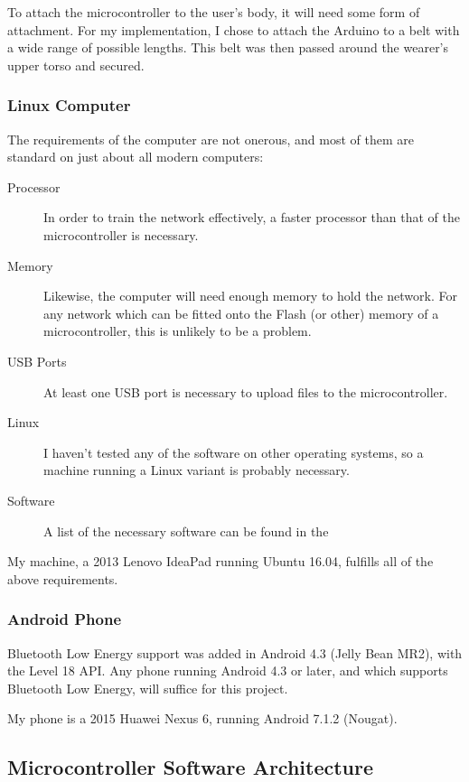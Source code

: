 \documentclass[a4paper]{article}
\begin{document}
To attach the microcontroller to the user's body, it will need some form of attachment. For my implementation, I chose to attach the Arduino to a belt with a wide range of possible lengths. This belt was then passed around the wearer's upper torso and secured. 


\subsubsection{Linux Computer}

The requirements of the computer are not onerous, and most of them are standard on just about all modern computers:

\begin{description}
\item[Processor] In order to train the network effectively, a faster processor than that of the microcontroller is necessary. 
\item[Memory] Likewise, the computer will need enough memory to hold the network. For any network which can be fitted onto the Flash (or other) memory of a microcontroller, this is unlikely to be a problem.
\item[USB Ports] At least one USB port is necessary to upload files to the microcontroller.
\item[Linux] I haven't tested any of the software on other operating systems, so a machine running a Linux variant is probably necessary.
\item[Software] A list of the necessary software can be found in the 
\end{description}

My machine, a 2013 Lenovo IdeaPad running Ubuntu 16.04, fulfills all of the above requirements.

\subsubsection{Android Phone}

Bluetooth Low Energy support was added in Android 4.3 (Jelly Bean MR2), with the Level 18 API.\cite{dsref5} Any phone running Android 4.3 or later, and which supports Bluetooth Low Energy, will suffice for this project.

My phone is a 2015 Huawei Nexus 6, running Android 7.1.2 (Nougat).

\subsection{Microcontroller Software Architecture}%
\end{document}

